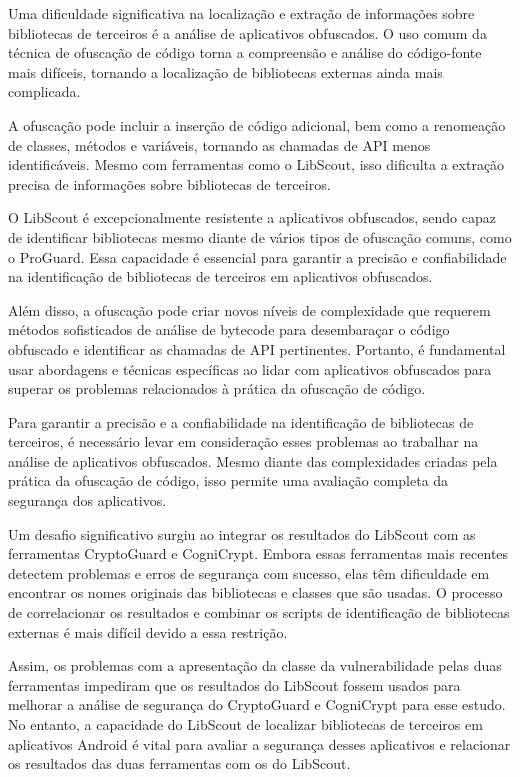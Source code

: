 Uma dificuldade significativa na localização e extração de informações sobre bibliotecas de terceiros é a análise de aplicativos obfuscados. O uso comum da técnica de ofuscação de código torna a compreensão e análise do código-fonte mais difíceis, tornando a localização de bibliotecas externas ainda mais complicada. \cite{api_tpl_zhang}

A ofuscação pode incluir a inserção de código adicional, bem como a renomeação de classes, métodos e variáveis, tornando as chamadas de API menos identificáveis. \cite{api_tpl_zhang} Mesmo com ferramentas como o LibScout, isso dificulta a extração precisa de informações sobre bibliotecas de terceiros. \cite{LibScout}

O LibScout é excepcionalmente resistente a aplicativos obfuscados, sendo capaz de identificar bibliotecas mesmo diante de vários tipos de ofuscação comuns, como o ProGuard. Essa capacidade é essencial para garantir a precisão e confiabilidade na identificação de bibliotecas de terceiros em aplicativos obfuscados. \cite{LibScout}

Além disso, a ofuscação pode criar novos níveis de complexidade que requerem métodos sofisticados de análise de bytecode para desembaraçar o código obfuscado e identificar as chamadas de API pertinentes. Portanto, é fundamental usar abordagens e técnicas específicas ao lidar com aplicativos obfuscados para superar os problemas relacionados à prática da ofuscação de código. \cite{api_tpl_zhang}

Para garantir a precisão e a confiabilidade na identificação de bibliotecas de terceiros, é necessário levar em consideração esses problemas ao trabalhar na análise de aplicativos obfuscados. Mesmo diante das complexidades criadas pela prática da ofuscação de código, isso permite uma avaliação completa da segurança dos aplicativos.

Um desafio significativo surgiu ao integrar os resultados do LibScout com as ferramentas CryptoGuard e CogniCrypt. Embora essas ferramentas mais recentes detectem problemas e erros de segurança com sucesso, elas têm dificuldade em encontrar os nomes originais das bibliotecas e classes que são usadas. O processo de correlacionar os resultados e combinar os scripts de identificação de bibliotecas externas é mais difícil devido a essa restrição.

Assim, os problemas com a apresentação da classe da vulnerabilidade pelas duas ferramentas impediram que os resultados do LibScout fossem usados para melhorar a análise de segurança do CryptoGuard e CogniCrypt para esse estudo. No entanto, a capacidade do LibScout de localizar bibliotecas de terceiros em aplicativos Android é vital para avaliar a segurança desses aplicativos e relacionar os resultados das duas ferramentas com os do LibScout.

